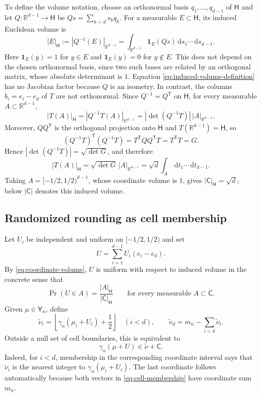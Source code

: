 \documentclass[11pt]{article}
\newcommand{\R}{\mathbb R}
\newcommand{\dd}{\,\mathrm d}
\newcommand{\htile}{\mathsf H}
\begin{document}
To define the volume notation, choose an orthonormal basis
$q_1,\ldots,q_{d-1}$ of $\htile$ and let
$Q:\R^{d-1}\to\htile$ be $Qs=\sum_{k<d}s_kq_k$.  For a measurable
$E\subset\htile$, its induced Euclidean volume is
\begin{equation}\label{eq:induced-volume-definition}
  |E|_{\htile}
  :=|Q^{-1}(E)|_{\R^{d-1}}
  =\int_{\R^{d-1}}\mathbf 1_E(Qs)\dd s_1\cdots\dd s_{d-1}.
\end{equation}
Here $\mathbf 1_E(y)=1$ for $y\in E$ and $\mathbf 1_E(y)=0$ for
$y\notin E$.
This does not depend on the chosen orthonormal basis, since two such bases
are related by an orthogonal matrix, whose absolute determinant is $1$.
Equation \eqref{eq:induced-volume-definition} has no Jacobian factor because
$Q$ is an isometry.  In contrast, the columns $b_i=e_i-e_d$ of $T$ are not
orthonormal.  Since $Q^{-1}=Q^{\mathsf T}$ on $\htile$, for every measurable
$A\subset\R^{d-1}$,
\[
  |T(A)|_{\htile}
  =|Q^{-1}T(A)|_{\R^{d-1}}
  =|\det(Q^{-1}T)|\,|A|_{\R^{d-1}}.
\]
Moreover, $QQ^{\mathsf T}$ is the orthogonal projection onto $\htile$ and
$T(\R^{d-1})=\htile$, so
\[
  (Q^{-1}T)^{\mathsf T}(Q^{-1}T)
  =T^{\mathsf T}QQ^{\mathsf T}T
  =T^{\mathsf T}T=G.
\]
Hence $|\det(Q^{-1}T)|=\sqrt{\det G}$, and therefore
\begin{equation}\label{eq:coordinate-volume}
  |T(A)|_{\htile}
  =\sqrt{\det G}\,|A|_{\R^{d-1}}
  =\sqrt d\int_A\dd t_1\cdots\dd t_{d-1}.
\end{equation}
Taking $A=[-1/2,1/2)^{d-1}$, whose coordinate volume is $1$, gives
$|\mathsf C|_{\htile}=\sqrt d$; below $|\mathsf C|$ denotes this induced
volume.

\subsection{Randomized rounding as cell membership}

Let $U_i$ be independent and uniform on $[-1/2,1/2)$ and set
\[
  U=\sum_{i=1}^{d-1}U_i(e_i-e_d).
\]
By \eqref{eq:coordinate-volume}, $U$ is uniform with respect to induced
volume in the concrete sense that
\[
  \Pr(U\in A)=\frac{|A|_{\htile}}{|\mathsf C|_{\htile}}
  \qquad\text{for every measurable }A\subset\mathsf C.
\]
Given $\mu\in\mathsf Y_n$, define
\[
  \widetilde\nu_i
  =\left\lfloor\gamma_n(\mu_i+U_i)+\frac12\right\rfloor
  \quad(i<d),
  \qquad
  \widetilde\nu_d=m_n-\sum_{i<d}\widetilde\nu_i.
\]
Outside a null set of cell boundaries, this is equivalent to
\begin{equation}\label{eq:cell-membership}
  \gamma_n(\mu+U)\in\widetilde\nu+\mathsf C.
\end{equation}
Indeed, for $i<d$, membership in the corresponding coordinate interval says
that $\widetilde\nu_i$ is the nearest integer to
$\gamma_n(\mu_i+U_i)$.  The last coordinate follows automatically because
both vectors in \eqref{eq:cell-membership} have coordinate sum $m_n$.
\end{document}
